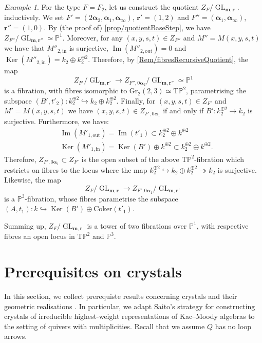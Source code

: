 \documentclass[a4paper,12pt]{article}
\theoremstyle{definition}
\theoremstyle{plain}
\theoremstyle{remark}
\newtheorem{example}[definition]{Example}
\DeclareMathOperator{\Ker}{Ker}
\DeclareMathOperator{\GL}{GL}
\DeclareMathOperator{\Ima}{Im}
\newcommand\bfalpha{\bm{\alpha}}
\newcommand\bfm{\mathbf{m}}
\newcommand\bfr{\mathbf{r}}
\begin{document}
\begin{example}
For the type $F = F_2$, let us construct the quotient $Z_{F}/\GL_{\bfm,\bfr}$. inductively. We set $F'=(2\bfalpha_2,\bfalpha_1,\bfalpha_\infty)$, $\bfr'=(1,2)$ and $F''=(\bfalpha_1,\bfalpha_\infty)$, $\bfr''=(1,0)$. By (the proof of) \cref{prop/quotientBaseStep}, we have $Z_{F''}/\GL_{\bfm,\bfr''}\simeq\mathbb{P}^1$. Moreover, for any $(x,y,s,t)\in Z_{F''}$ and $M''=M(x,y,s,t)$ we have that $M''_{2,\mathrm{in}}$ is surjective, $\Ima(M''_{2,\mathrm{out}})=0$ and $\Ker(M''_{2,\mathrm{in}})=k_2\oplus k_2^{\oplus 2}$. Therefore, by \cref{Rem/fibresRecursiveQuotient}, the map
\[
Z_{F'}/\GL_{\bfm,\bfr'}\rightarrow Z_{F'',0\bfalpha_2}/\GL_{\bfm,\bfr''}\simeq\mathbb{P}^1
\]
is a fibration, with fibres isomorphic to $\mathrm{Gr}_2(2,3)\simeq\mathrm{T}\mathbb{P}^2$, parametrising the subspace $(B',t'_2):k_2^{\oplus 2}\hookrightarrow k_2\oplus k_2^{\oplus 2}$. Finally, for $(x,y,s,t)\in Z_{F'}$ and $M'=M(x,y,s,t)$ we have $(x,y,s,t)\in Z_{F',0\bfalpha_1}$ if and only if $B':k_2^{\oplus 2}\rightarrow k_2$ is surjective. Furthermore, we have:
\begin{align*}
& \Ima(M'_{1,\mathrm{out}})=\Ima(t'_1)\subset k_2^{\oplus 2}\oplus k^{\oplus 2} \\
& \Ker(M'_{1,\mathrm{in}})=\Ker(B')\oplus k^{\oplus 2}\subset k_2^{\oplus 2}\oplus k^{\oplus 2}.
\end{align*}
Therefore, $Z_{F',0\bfalpha_1}\subset Z_{F'}$ is the open subset of the above $\mathrm{T}\mathbb{P}^2$-fibration which restricts on fibres to the locus where the map $k_2^{\oplus 2}\hookrightarrow k_2\oplus k_2^{\oplus 2}\twoheadrightarrow k_2$ is surjective. Likewise, the map
\[
Z_F/\GL_{\bfm,\bfr}\rightarrow Z_{F',0\bfalpha_1}/\GL_{\bfm,\bfr'}
\]
is a $\mathbb{P}^3$-fibration, whose fibres parametrise the subspace $(A,t_1):k\hookrightarrow\Ker(B')\oplus\mathrm{Coker}(t'_1)$.

Summing up, $Z_F/\GL_{\bfm,\bfr}$ is a tower of two fibrations over $\mathbb{P}^1$, with respective fibres an open locus in $\mathrm{T}\mathbb{P}^2$ and $\mathbb{P}^3$.
\end{example}

\section{Prerequisites on crystals}\label{Sect/prerequisitesCrystals}

In this section, we collect prerequiste results concerning crystals and their geometric realisations \cite{KS97,Sai02,GLS18a}. In particular, we adapt Saito's strategy for constructing crystals of irreducible highest-weight representations of Kac--Moody algebras \cite{Sai02} to the setting of quivers with multiplicities. Recall that we assume $Q$ has no loop arrows.
\end{document}
